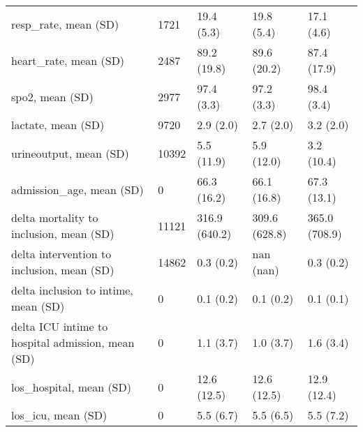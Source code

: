 \begin{tabular}{lllll}
resp\_rate, mean (SD)                              &    1721 &     19.4 (5.3) &        19.8 (5.4) &             17.1 (4.6) \\
heart\_rate, mean (SD)                             &    2487 &    89.2 (19.8) &       89.6 (20.2) &            87.4 (17.9) \\
spo2, mean (SD)                                   &    2977 &     97.4 (3.3) &        97.2 (3.3) &             98.4 (3.4) \\
lactate, mean (SD)                                &    9720 &      2.9 (2.0) &         2.7 (2.0) &              3.2 (2.0) \\
urineoutput, mean (SD)                            &   10392 &     5.5 (11.9) &        5.9 (12.0) &             3.2 (10.4) \\
admission\_age, mean (SD)                          &       0 &    66.3 (16.2) &       66.1 (16.8) &            67.3 (13.1) \\
delta mortality to inclusion, mean (SD)           &   11121 &  316.9 (640.2) &     309.6 (628.8) &          365.0 (708.9) \\
delta intervention to inclusion, mean (SD)        &   14862 &      0.3 (0.2) &         nan (nan) &              0.3 (0.2) \\
delta inclusion to intime, mean (SD)              &       0 &      0.1 (0.2) &         0.1 (0.2) &              0.1 (0.1) \\
delta ICU intime to hospital admission, mean (SD) &       0 &      1.1 (3.7) &         1.0 (3.7) &              1.6 (3.4) \\
los\_hospital, mean (SD)                           &       0 &    12.6 (12.5) &       12.6 (12.5) &            12.9 (12.4) \\
los\_icu, mean (SD)                                &       0 &      5.5 (6.7) &         5.5 (6.5) &              5.5 (7.2) \\
\bottomrule
\end{tabular}
